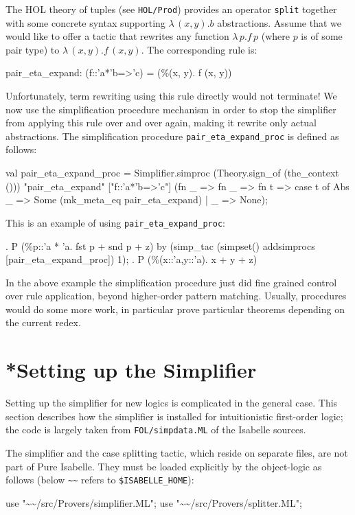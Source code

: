 The HOL theory of tuples (see \texttt{HOL/Prod}) provides an operator
\texttt{split} together with some concrete syntax supporting
$\lambda\,(x,y).b$ abstractions.  Assume that we would like to offer a tactic
that rewrites any function $\lambda\,p.f\,p$ (where $p$ is of some pair type)
to $\lambda\,(x,y).f\,(x,y)$.  The corresponding rule is:
\begin{ttbox}
pair_eta_expand:  (f::'a*'b=>'c) = (\%(x, y). f (x, y))
\end{ttbox}
Unfortunately, term rewriting using this rule directly would not
terminate!  We now use the simplification procedure mechanism in order
to stop the simplifier from applying this rule over and over again,
making it rewrite only actual abstractions.  The simplification
procedure \texttt{pair_eta_expand_proc} is defined as follows:
\begin{ttbox}
val pair_eta_expand_proc =
  Simplifier.simproc (Theory.sign_of (the_context ()))
    "pair_eta_expand" ["f::'a*'b=>'c"]
    (fn _ => fn _ => fn t =>
      case t of Abs _ => Some (mk_meta_eq pair_eta_expand)
      | _ => None);
\end{ttbox}
This is an example of using \texttt{pair_eta_expand_proc}:
\begin{ttbox}
{. P (\%p::'a * 'a. fst p + snd p + z)}
by (simp_tac (simpset() addsimprocs [pair_eta_expand_proc]) 1);
{. P (\%(x::'a,y::'a). x + y + z)}
\end{ttbox}

\medskip

In the above example the simplification procedure just did fine
grained control over rule application, beyond higher-order pattern
matching.  Usually, procedures would do some more work, in particular
prove particular theorems depending on the current redex.


\section{*Setting up the Simplifier}\label{sec:setting-up-simp}

Setting up the simplifier for new logics is complicated in the general case.
This section describes how the simplifier is installed for intuitionistic
first-order logic; the code is largely taken from {\tt FOL/simpdata.ML} of the
Isabelle sources.

The simplifier and the case splitting tactic, which reside on separate files,
are not part of Pure Isabelle.  They must be loaded explicitly by the
object-logic as follows (below \texttt{\~\relax\~\relax} refers to
\texttt{\$ISABELLE_HOME}):
\begin{ttbox}
use "\~\relax\~\relax/src/Provers/simplifier.ML";
use "\~\relax\~\relax/src/Provers/splitter.ML";
\end{ttbox}

